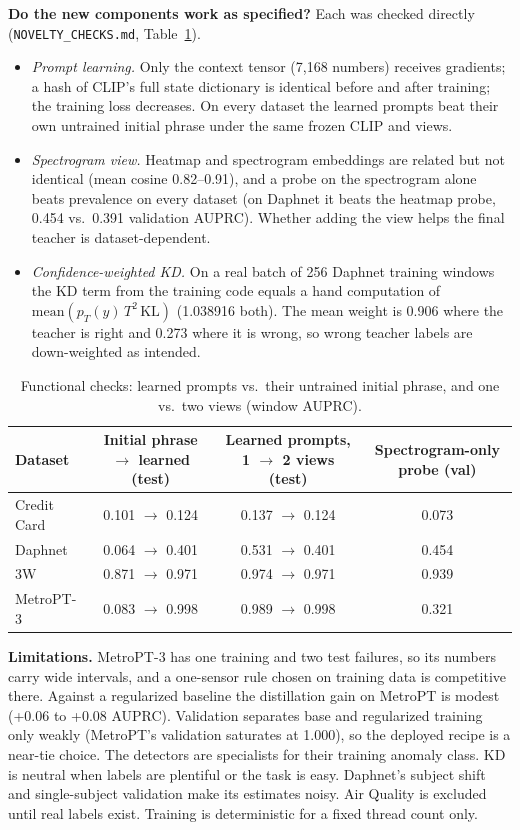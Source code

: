 \documentclass[twoside,english]{article}
\begin{document}
\textbf{Do the new components work as specified?} Each was checked directly (\texttt{NOVELTY\_CHECKS.md}, Table~\ref{tab:checks}).
\begin{itemize}[leftmargin=*,nosep]
\item \emph{Prompt learning.} Only the context tensor (7{,}168 numbers) receives gradients; a hash of CLIP's full state dictionary is identical before and after training; the training loss decreases. On every dataset the learned prompts beat their own untrained initial phrase under the same frozen CLIP and views.
\item \emph{Spectrogram view.} Heatmap and spectrogram embeddings are related but not identical (mean cosine 0.82--0.91), and a probe on the spectrogram alone beats prevalence on every dataset (on Daphnet it beats the heatmap probe, 0.454 vs.\ 0.391 validation AUPRC). Whether adding the view helps the final teacher is dataset-dependent.
\item \emph{Confidence-weighted KD.} On a real batch of 256 Daphnet training windows the KD term from the training code equals a hand computation of $\mathrm{mean}(p_T(y)\,T^2\,\mathrm{KL})$ (1.038916 both). The mean weight is 0.906 where the teacher is right and 0.273 where it is wrong, so wrong teacher labels are down-weighted as intended.
\end{itemize}

\begin{table}[h]
\centering\small
\caption{Functional checks: learned prompts vs.\ their untrained initial phrase, and one vs.\ two views (window AUPRC).}
\label{tab:checks}
\begin{tabular}{lccc}
\toprule
Dataset & Initial phrase $\rightarrow$ learned (test) & Learned prompts, 1 $\rightarrow$ 2 views (test) & Spectrogram-only probe (val) \\
\midrule
Credit Card & 0.101 $\rightarrow$ 0.124 & 0.137 $\rightarrow$ 0.124 & 0.073 \\
Daphnet & 0.064 $\rightarrow$ 0.401 & 0.531 $\rightarrow$ 0.401 & 0.454 \\
3W & 0.871 $\rightarrow$ 0.971 & 0.974 $\rightarrow$ 0.971 & 0.939 \\
MetroPT-3 & 0.083 $\rightarrow$ 0.998 & 0.989 $\rightarrow$ 0.998 & 0.321 \\
\bottomrule
\end{tabular}
\end{table}

\textbf{Limitations.} MetroPT-3 has one training and two test failures, so its numbers carry wide intervals, and a one-sensor rule chosen on training data is competitive there. Against a regularized baseline the distillation gain on MetroPT is modest (+0.06 to +0.08 AUPRC). Validation separates base and regularized training only weakly (MetroPT's validation saturates at 1.000), so the deployed recipe is a near-tie choice. The detectors are specialists for their training anomaly class. KD is neutral when labels are plentiful or the task is easy. Daphnet's subject shift and single-subject validation make its estimates noisy. Air Quality is excluded until real labels exist. Training is deterministic for a fixed thread count only.
\end{document}
